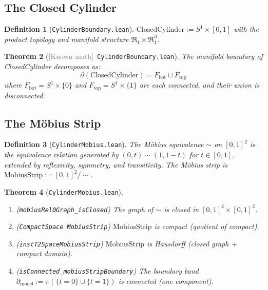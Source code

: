 \documentclass[11pt]{article}
\newtheorem{theorem}{Theorem}[section]
\newtheorem{definition}[theorem]{Definition}
\newcommand{\leanref}[1]{\texttt{\small #1}}
\newcommand{\known}{\textcolor{gray}{[Known math]}}
\begin{document}

\subsection{The Closed Cylinder}
\label{sec:cylinder}

\begin{definition}[\leanref{CylinderBoundary.lean}]
$\mathrm{ClosedCylinder} := S^1 \times [0,1]$ with the product topology and manifold structure $\mathfrak{R}_1 \times \mathfrak{R}_1^\partial$.
\end{definition}

\begin{theorem}[\known\ \leanref{CylinderBoundary.lean}]
\label{thm:cyl-boundary}
The manifold boundary of \emph{ClosedCylinder} decomposes as:
\[
  \partial(\mathrm{ClosedCylinder}) = F_{\mathrm{bot}} \sqcup F_{\mathrm{top}}
\]
where $F_{\mathrm{bot}} = S^1 \times \{0\}$ and $F_{\mathrm{top}} = S^1 \times \{1\}$ are each connected, and their union is \emph{disconnected}.
\end{theorem}


\subsection{The M\"obius Strip}
\label{sec:mobius}

\begin{definition}[\leanref{CylinderMobius.lean}]
\label{def:mobius-rel}
The \emph{M\"obius equivalence} $\sim$ on $[0,1]^2$ is the equivalence relation generated by
$(0, t) \sim (1, 1-t)$ for $t \in [0,1]$, extended by reflexivity, symmetry, and transitivity.
The \emph{M\"obius strip} is $\mathrm{MobiusStrip} := [0,1]^2 / {\sim}$.
\end{definition}

\begin{theorem}[\leanref{CylinderMobius.lean}]
\label{thm:mobius-props}
\leavevmode
\begin{enumerate}[label=(\alph*)]
\item (\leanref{mobiusRel0Graph\_isClosed}) The graph of $\sim$ is closed in $[0,1]^2 \times [0,1]^2$.
\item (\leanref{CompactSpace MobiusStrip}) $\mathrm{MobiusStrip}$ is compact (quotient of compact).
\item (\leanref{instT2SpaceMobiusStrip}) $\mathrm{MobiusStrip}$ is Hausdorff (closed graph + compact domain).
\item (\leanref{isConnected\_mobiusStripBoundary}) The boundary band $\partial_{\mathrm{model}} := \pi(\{t = 0\} \cup \{t = 1\})$ is connected (one component).
\end{enumerate}
\end{theorem}
\end{document}
